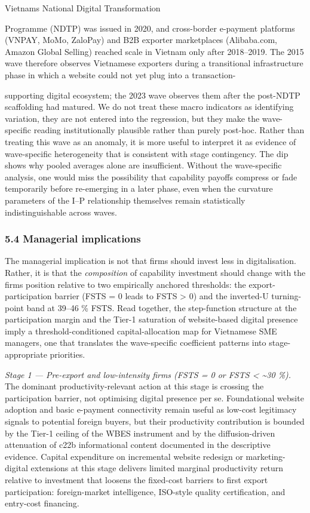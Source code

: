 \documentclass[12pt,a4paper]{article}
\begin{document}
Vietnam\textquotesingle s National Digital Transformation

Programme (NDTP) was issued in 2020, and cross-border e-payment
platforms (VNPAY, MoMo, ZaloPay) and B2B exporter marketplaces
(Alibaba.com, Amazon Global Selling) reached scale in Vietnam only after
2018--2019. The 2015 wave therefore observes Vietnamese exporters during
a transitional infrastructure phase in which a website could not yet
plug into a transaction-

supporting digital ecosystem; the 2023 wave observes them after the
post-NDTP scaffolding had matured. We do not treat these macro
indicators as identifying variation, they are not entered into the
regression, but they make the wave-specific reading institutionally
plausible rather than purely post-hoc. Rather than treating this wave as
an anomaly, it is more useful to interpret it as evidence of
wave-specific heterogeneity that is consistent with stage contingency.
The dip shows why pooled averages alone are insufficient. Without the
wave-specific analysis, one would miss the possibility that capability
payoffs compress or fade temporarily before re-emerging in a later
phase, even when the curvature parameters of the I--P relationship
themselves remain statistically indistinguishable across waves.

\hypertarget{54-managerial-implications}{%
\subsubsection{5.4 Managerial
implications}\label{54-managerial-implications}}

The managerial implication is not that firms should invest less in
digitalisation. Rather, it is that the \emph{composition} of capability
investment should change with the firm\textquotesingle s position
relative to two empirically anchored thresholds: the
export-participation barrier (FSTS = 0 leads to FSTS \textgreater{} 0)
and the inverted-U turning-point band at 39--46 \% FSTS. Read together,
the step-function structure at the participation margin and the Tier-1
saturation of website-based digital presence imply a
threshold-conditioned capital-allocation map for Vietnamese SME
managers, one that translates the wave-specific coefficient patterns
into stage-appropriate priorities.

\emph{Stage 1 --- Pre-export and low-intensity firms (FSTS = 0 or FSTS
\textless{} \textasciitilde30 \%).} The dominant productivity-relevant
action at this stage is crossing the participation barrier, not
optimising digital presence per se. Foundational website adoption and
basic e-payment connectivity remain useful as low-cost legitimacy
signals to potential foreign buyers, but their productivity contribution
is bounded by the Tier-1 ceiling of the WBES instrument and by the
diffusion-driven attenuation of c22b informational content documented in
the descriptive evidence. Capital expenditure on incremental website
redesign or marketing-digital extensions at this stage delivers limited
marginal productivity return relative to investment that loosens the
fixed-cost barriers to first export participation: foreign-market
intelligence, ISO-style quality certification, and entry-cost financing.
\end{document}
